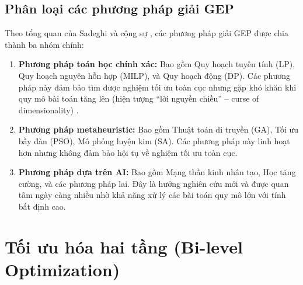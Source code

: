 \subsection{Phân loại các phương pháp giải GEP}

Theo tổng quan của Sadeghi và cộng sự \cite{sadeghi2017gep_review}, các phương pháp giải GEP được chia thành ba nhóm chính:

\begin{enumerate}
    \item \textbf{Phương pháp toán học chính xác:} Bao gồm Quy hoạch tuyến tính (LP), Quy hoạch nguyên hỗn hợp (MILP), và Quy hoạch động (DP). Các phương pháp này đảm bảo tìm được nghiệm tối ưu toàn cục nhưng gặp khó khăn khi quy mô bài toán tăng lên (hiện tượng ``lời nguyền chiều'' -- curse of dimensionality) \cite{oree2017gep_review}.
    
    \item \textbf{Phương pháp metaheuristic:} Bao gồm Thuật toán di truyền (GA), Tối ưu bầy đàn (PSO), Mô phỏng luyện kim (SA). Các phương pháp này linh hoạt hơn nhưng không đảm bảo hội tụ về nghiệm tối ưu toàn cục.
    
    \item \textbf{Phương pháp dựa trên AI:} Bao gồm Mạng thần kinh nhân tạo, Học tăng cường, và các phương pháp lai. Đây là hướng nghiên cứu mới và được quan tâm ngày càng nhiều nhờ khả năng xử lý các bài toán quy mô lớn với tính bất định cao.
\end{enumerate}

\section{Tối ưu hóa hai tầng (Bi-level Optimization)}

